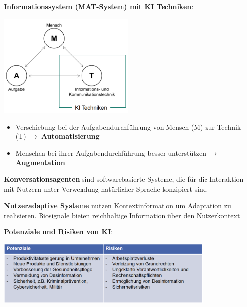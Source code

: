 \textbf{Informationssystem (MAT-System) mit KI Techniken}:
\begin{center}
	\includegraphics[width=0.5\textwidth]{images/mat-ki.png}
\end{center}
\begin{itemize}
	\item Verschiebung bei der Aufgabendurchführung von Mensch (M) zur Technik (T) $\rightarrow$ \textbf{Automatisierung}
	\item Menschen bei ihrer Aufgabendurchführung besser unterstützen $\rightarrow$ \textbf{Augmentation}
\end{itemize}

\textbf{Konversationsagenten} sind softwarebasierte Systeme, die für die Interaktion mit Nutzern unter Verwendung natürlicher Sprache konzipiert sind

\textbf{Nutzeradaptive Systeme} nutzen Kontextinformation um Adaptation zu realisieren. Biosignale bieten reichhaltige Information über den Nutzerkontext

\pagebreak
\textbf{Potenziale und Risiken von KI}:
\begin{center}
	\includegraphics[width=0.8\textwidth]{images/ki-risc.png}
\end{center}

